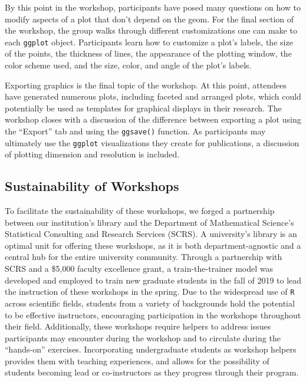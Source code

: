 \documentclass[12pt]{article}
\begin{document}
\quad By this point in the workshop, participants have posed many questions on how to modify aspects of a plot that don't depend on the geom. For the final section of the workshop, the group walks through different customizations one can make to each \texttt{ggplot} object. Participants learn how to customize a plot's labels, the size of the points, the thickness of lines, the appearance of the plotting window, the color scheme used, and the size, color, and angle of the plot's labels. 

\quad Exporting graphics is the final topic of the workshop. At this point, attendees have generated numerous plots, including faceted and arranged plots, which could potentially be used as templates for graphical displays in their research. The workshop closes with a discussion of the difference between exporting a plot using the ``Export'' tab and using the \texttt{ggsave()} function. As participants may ultimately use the \texttt{ggplot} visualizations they create for publications, a discussion of plotting dimension and resolution is included. 


\subsection{Sustainability of Workshops}  

\quad To facilitate the sustainability of these workshops, we forged a partnership between our institution's library and the Department of Mathematical Science's Statistical Consulting and Research Services (SCRS). A university's library is an optimal unit for offering these workshops, as it is both department-agnostic and a central hub for the entire university community. Through a partnership with SCRS and a \$5,000 faculty excellence grant, a train-the-trainer model was developed and employed to train new graduate students in the fall of 2019 to lead the instruction of these workshops in the spring. Due to the widespread use of \texttt{R} across scientific fields, students from a variety of backgrounds hold the potential to be effective instructors,  encouraging participation in the workshops throughout their field. Additionally, these workshops require helpers to address issues participants may encounter during the workshop and to circulate during the ``hands-on'' exercises. Incorporating undergraduate students as workshop helpers provides them with teaching experiences, and allows for the possibility of students becoming lead or co-instructors as they progress through their program. 
\end{document}
